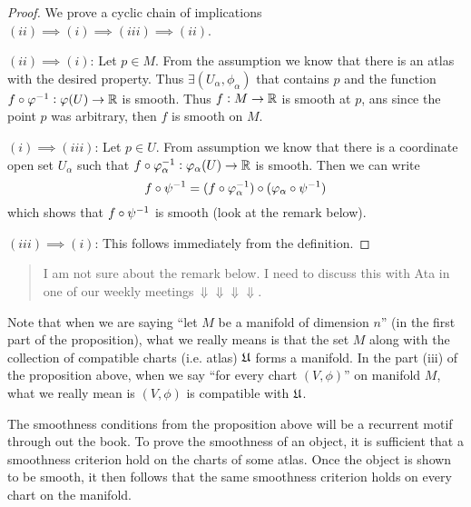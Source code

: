 \begin{proof}
	We prove a cyclic chain of implications $ (ii)\implies (i) \implies (iii) \implies (ii) $.
	
	\noindent $ (ii) \implies (i) $: Let $ p \in M $. From the assumption we know that there is an atlas with the desired property. Thus $ \exists (U_\alpha,\phi_\alpha)  $ that contains $ p $ and the function $ f\circ\varphi^{-1}: \varphi(U) \to \mathbb{R} $ is smooth. 
	Thus $ f:M\to \mathbb{R} $ is smooth at $ p $, ans since the point $ p $ was arbitrary, then $ f $ is smooth on $ M $.
	
	\noindent $ (i) \implies (iii) $: Let $ p \in U $. From assumption we know that there is a coordinate open set $ U_\alpha $ such that $ f \circ \varphi_\alpha^{-1}: \varphi_\alpha(U)\to \mathbb{R} $ is smooth. Then we can write
	\[ f\circ\psi^{-1} = (f\circ\varphi_\alpha^{-1})\circ(\varphi_\alpha \circ \psi^{-1}) \]
	which shows that $ f\circ\psi^{-1}  $ is smooth (look at the remark below).
	
	\noindent $ (iii) \implies (i) $: This follows immediately from the definition.
\end{proof}

\begin{quote}
	{\color{orange} I am not sure about the remark below. I need to discuss this with Ata in one of our weekly meetings$\ \Downarrow\Downarrow\Downarrow\Downarrow$.}
\end{quote}
\begin{remark}
	Note that when we are saying ``let $ M $ be a manifold of dimension $ n $'' (in the first part of the proposition), what we really means is that the set $ M $ along with the collection of compatible charts (i.e. atlas) $ \frak{U} $ forms a manifold. In the part (iii) of the proposition above, when we say ``for every chart $ (V,\phi) $'' on manifold $ M $, what we really mean is $ (V,\phi) $ is compatible with $ \frak{U} $.
\end{remark}

\begin{observation}[From W. Tu]
	The smoothness conditions from the proposition above will be a recurrent motif through out the book. To prove the smoothness of an object, it is sufficient that a smoothness criterion hold on the charts of some atlas. Once the object is shown to be smooth, it then follows that the same smoothness criterion holds on every chart on the manifold.
\end{observation}



